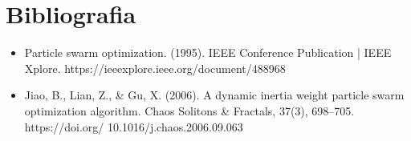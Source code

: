\documentclass[12pt]{article}
\begin{document}
\section{Bibliografia}
\begin{itemize}
	\item{Particle swarm optimization. (1995). IEEE Conference Publication | IEEE Xplore. https://ieeexplore.ieee.org/document/488968}
	\item{Jiao, B., Lian, Z., \& Gu, X. (2006). A dynamic inertia weight particle swarm optimization algorithm. Chaos Solitons \& Fractals, 37(3), 698–705. https://doi.org/ 10.1016/j.chaos.2006.09.063}
\end{itemize}
\end{document}
